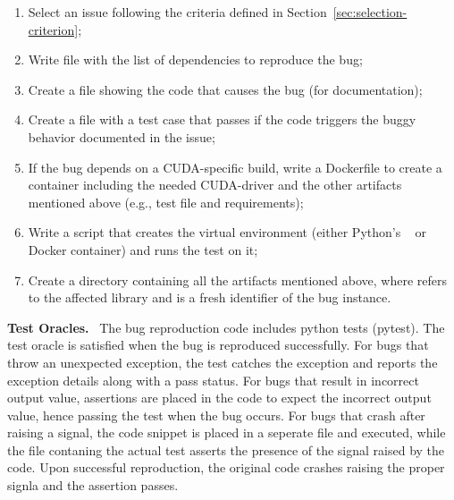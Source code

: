 \documentclass[sigconf,screen]{acmart}
\begin{document}
\begin{enumerate}[leftmargin=0.5cm]
  \item Select an issue following the criteria defined in Section~\ref{sec:selection-criterion};
  \item Write file  with the list of dependencies to reproduce the bug;
  \item Create a file showing the code that causes the bug (for documentation);
  \item Create a file with a  test case that passes if
    the code triggers the buggy behavior documented in the issue;
  \item If the bug depends on a CUDA-specific build, write a
    Dockerfile to create a container including the needed CUDA-driver
    and the other artifacts mentioned above (e.g., test file and
    requirements);
  \item Write a script that creates the virtual environment (either
    Python's ~\cite{venv} or Docker container) and runs
    the test on it;
  \item Create a directory  containing all the
    artifacts mentioned above, where  refers to the
    affected library and  is a fresh identifier of the
    bug instance.
\end{enumerate}

\textbf{Test Oracles.}~
The bug reproduction code includes python tests (pytest). The test
oracle is satisfied when the bug is reproduced successfully. For bugs
that throw an unexpected exception, the test catches the exception and
reports the exception details along with a pass status. For bugs that
result in incorrect output value, assertions are placed in the code to
expect the incorrect output value, hence passing the test when the bug
occurs. For bugs that crash after raising a signal, the code snippet
is placed in a seperate file and executed, while the file contaning
the actual test asserts the presence of the signal raised by the
code. Upon successful reproduction, the original code crashes raising
the proper signla and the assertion passes.
\end{document}
